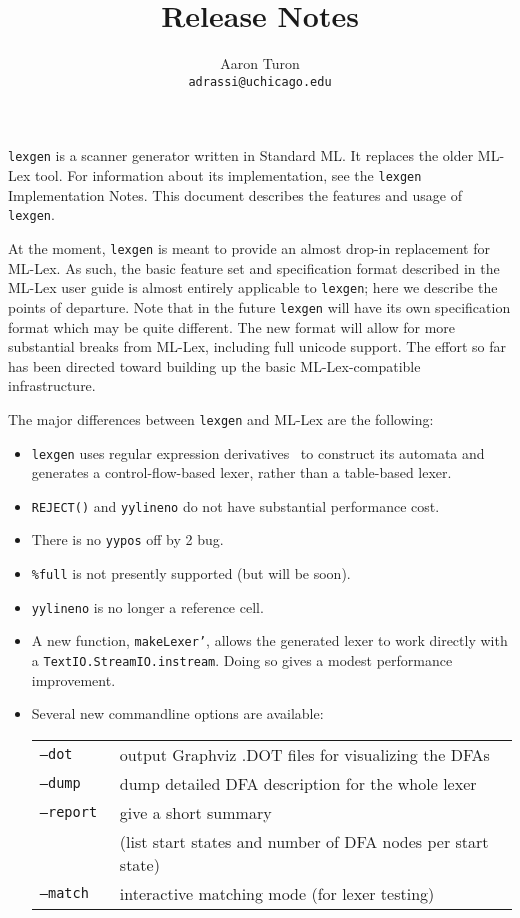\documentclass[11pt]{article}
\title{\flex{} Release Notes}
\author{Aaron Turon\\
\texttt{adrassi@uchicago.edu}}
\newcommand{\flex}{\texttt{lexgen}}
\begin{document}
\maketitle

\flex{} is a scanner generator written in Standard ML.  It replaces the older
ML-Lex tool.  For information about its implementation, see the
\flex{} Implementation Notes. This document describes the features and usage of
\flex{}.

At the moment, \flex{} is meant to provide an almost drop-in replacement for
ML-Lex.  As such, the basic feature set and specification format described in
the ML-Lex user guide is almost entirely applicable to \flex{}; here we describe
the points of departure.  Note that in the future \flex{} will have its own
specification format which may be quite different.  The new format will allow
for more substantial breaks from ML-Lex, including full unicode support.  The
effort so far has been directed toward building up the basic ML-Lex-compatible
infrastructure.

The major differences between \flex{} and ML-Lex are the following:
\begin{itemize}

\item \flex{} uses regular expression derivatives~\cite{derivatives} to
construct
its automata and generates a control-flow-based lexer, rather than a
table-based lexer.

\item \texttt{REJECT()} and \texttt{yylineno} do not have substantial
performance cost.

\item There is no \texttt{yypos} off by 2 bug.

\item \texttt{\%full} is not presently supported (but will be soon).

\item \texttt{yylineno} is no longer a reference cell.

\item A new function, \texttt{makeLexer'}, allows the generated lexer to work
directly with a \texttt{TextIO.StreamIO.instream}.  Doing so gives a modest
performance improvement.

\item Several new commandline options are available:

\begin{center}
\begin{tabular}{ll}
\tt --dot & output Graphviz .DOT files for visualizing the DFAs \\
\tt --dump & dump detailed DFA description for the whole lexer \\
\tt --report & give a short summary \\
    & (list start states and number of DFA nodes
per start state) \\
\tt --match & interactive matching mode (for lexer testing)
\end{tabular}
\end{center}


\end{itemize}



\end{document}
